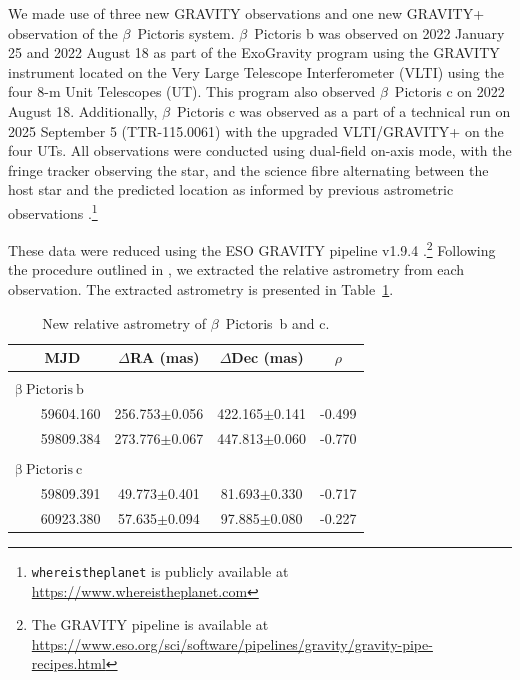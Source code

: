 \documentclass{aa}
\begin{document}
	We made use of three new GRAVITY observations and one new GRAVITY+ observation of the $\beta$~Pictoris system.
	$\beta$~Pictoris b was observed on 2022 January 25 and 2022 August 18 as part of the ExoGravity program \citep[1104.C-0651;][]{Lacour_2020} using the GRAVITY instrument \citep{GRAVITY_Collaboration_2017} located on the Very Large Telescope Interferometer (VLTI) using the four 8-m Unit Telescopes (UT).
	This program also observed $\beta$~Pictoris c on 2022 August 18.
	Additionally, $\beta$~Pictoris c was observed as a part of a technical run on 2025 September 5 (TTR-115.0061) with the upgraded VLTI/GRAVITY+ \citep{GRAVITY+_Collaboration_2025} on the four UTs.
	All observations were conducted using dual-field on-axis mode, with the fringe tracker observing the star, and the science fibre alternating between the host star and the predicted location as informed by previous astrometric observations \citep{Wang_2021}.\footnote{\texttt{whereistheplanet} is publicly available at \href{https://www.whereistheplanet.com}{https://www.whereistheplanet.com}} 
	
	These data were reduced using the ESO GRAVITY pipeline v1.9.4 \citep{Lapeyrere_2014}.\footnote{The GRAVITY pipeline is available at \href{https://www.eso.org/sci/software/pipelines/gravity/gravity-pipe-recipes.html}{https://www.eso.org/sci/software/pipelines/gravity/gravity-pipe-recipes.html}} Following the procedure outlined in \citet{kammerer_2025}, we extracted the relative astrometry from each observation.
	The extracted astrometry is presented in Table~\ref{tab:new_astrometry}.
	
	\begin{table}
		\caption{New relative astrometry of $\beta$~Pictoris~b and c. }
		\label{tab:new_astrometry}
		\centering
		\begin{tabular}{l c c c}
			\hline 
			~~~ MJD & $\Delta$RA (mas) & $\Delta$Dec (mas) & $\rho$\\
			\hline \hline \\[-0.3cm]
			$\mathrm{\beta~Pictoris~b}$ & & & \\
			~~~ 59604.160 & 256.753$\pm$0.056 & 422.165$\pm$0.141 & -0.499\\
			~~~ 59809.384 & 273.776$\pm$0.067 & 447.813$\pm$0.060 & -0.770\\
			\hline\\[-0.3cm]
			$\mathrm{\beta~Pictoris~c}$ & & & \\
			~~~ 59809.391 & 49.773$\pm$0.401 & 81.693$\pm$0.330 & -0.717\\
			~~~ 60923.380 & 57.635$\pm$0.094 & 97.885$\pm$0.080 & -0.227\\
			\hline
		\end{tabular}
	\end{table}
	
\end{document}
